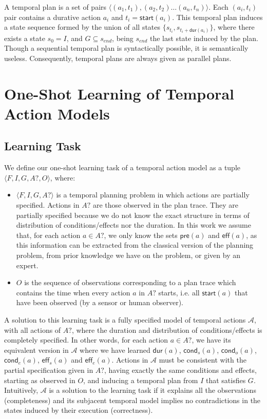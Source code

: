 \documentclass[runningheads]{llncs}
\newcommand{\tup}[1]{{\langle #1 \rangle}}
\newcommand{\pre}{\mathsf{pre}}    %
\newcommand{\eff}{\mathsf{eff}}    %
\newcommand{\cond}{\mathsf{cond}}  %
\newcommand{\dur}{\mathsf{dur}}    %
\newcommand{\start}{\mathsf{start}}%
\begin{document}
A temporal plan is a set of pairs $\tup{(a_1,t_1),(a_2,t_2)\ldots (a_n,t_n)}$. Each $(a_i,t_i)$ pair contains a durative action $a_i$ and $t_i=\start(a_i)$.
This temporal plan induces a state sequence formed by the union of all states $\{s_{t_i}, s_{t_i+\dur(a_i)}\}$, where there exists a state $s_{0}=I$, and $G\subseteq s_{end}$, being $s_{end}$ the last state induced by the plan.
Though a sequential temporal plan is syntactically possible, it is semantically useless. Consequently, temporal plans are always given as parallel plans.



\section{One-Shot Learning of Temporal Action Models}

\subsection{Learning Task}
\label{sec:learningtask}

We define our one-shot learning task of a temporal action model as a tuple $\tup{F,I,G,A?,O}$, where:

\begin{itemize}

\item $\tup{F,I,G,A?}$ is a temporal planning problem in which actions are partially specified. Actions in $A?$ are those observed in the plan trace. They are partially specified because we do not know the exact structure in terms of distribution of conditions/effects nor the duration. In this work we assume that, for each action $a \in A?$, we only know the sets $\pre(a)$ and $\eff(a)$, as this information can be extracted from the classical version of the planning problem, from prior knowledge we have on the problem, or given by an expert.

\item $O$ is the sequence of observations corresponding to a plan trace which contains the time when every action $a$ in $A?$ starts, i.e. all $\start(a)$ that have been observed (by a sensor or human observer).

\end{itemize}


A solution to this learning task is a fully specified model of temporal actions $\mathcal{A}$, with all actions of $A?$, where the duration and distribution of conditions/effects is completely specified. In other words, for each action $a \in A?$, we have its equivalent version in $\mathcal{A}$ where we have learned $\dur(a)$, $\cond_s(a)$, $\cond_o(a)$, $\cond_e(a)$, $\eff_s(a)$ and $\eff_e(a)$.
Actions in $\mathcal{A}$ must be consistent with the partial specification given in $A?$, having exactly the same conditions and effects, starting as observed in $O$, and inducing a temporal plan from $I$ that satisfies $G$. Intuitively, $\mathcal{A}$ is a solution to the learning task if it explains all the observations (completeness) and its subjacent temporal model implies no contradictions in the states induced by their execution (correctness).
\end{document}
